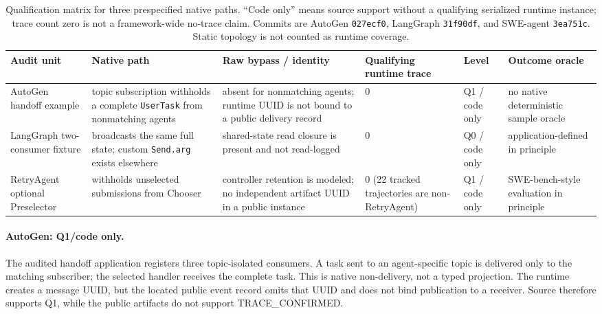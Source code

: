 \documentclass[letterpaper]{article} %
\begin{document}
\begin{table}[t]
\centering
\small
\setlength{\tabcolsep}{4pt}
\begin{tabular}{p{}p{}p{}p{}p{}p{}}
\toprule
\textbf{Audit unit} & \textbf{Native path} & \textbf{Raw bypass / identity} & \textbf{Qualifying runtime trace} & \textbf{Level} & \textbf{Outcome oracle} \\
\midrule
AutoGen handoff example & topic subscription withholds a complete \texttt{UserTask} from nonmatching agents & absent for nonmatching agents; runtime UUID is not bound to a public delivery record & 0 & Q1 / code only & no native deterministic sample oracle \\
LangGraph two-consumer fixture & broadcasts the same full state; custom \texttt{Send.arg} exists elsewhere & shared-state read closure is present and not read-logged & 0 & Q0 / code only & application-defined in principle \\
RetryAgent optional Preselector & withholds unselected submissions from Chooser & controller retention is modeled; no independent artifact UUID in a public instance & 0 (22 tracked trajectories are non-RetryAgent) & Q1 / code only & SWE-bench-style evaluation in principle \\
\bottomrule
\end{tabular}
\caption{Qualification matrix for three prespecified native paths. ``Code
only'' means source support without a qualifying serialized runtime instance;
trace count zero is not a framework-wide no-trace claim. Commits are AutoGen
\texttt{027ecf0}, LangGraph \texttt{31f90df}, and SWE-agent
\texttt{3ea751c}. Static topology is not counted as runtime coverage.}
\label{tab:audit}
\end{table}

\paragraph{AutoGen: Q1/code only.}
The audited handoff application registers three topic-isolated consumers. A
task sent to an agent-specific topic is delivered only to the matching
subscriber; the selected handler receives the complete task. This is native
non-delivery, not a typed projection. The runtime creates a message UUID, but
the located public event record omits that UUID and does not bind publication
to a receiver. Source therefore supports Q1, while the public artifacts do not
support TRACE\_CONFIRMED.
\end{document}
